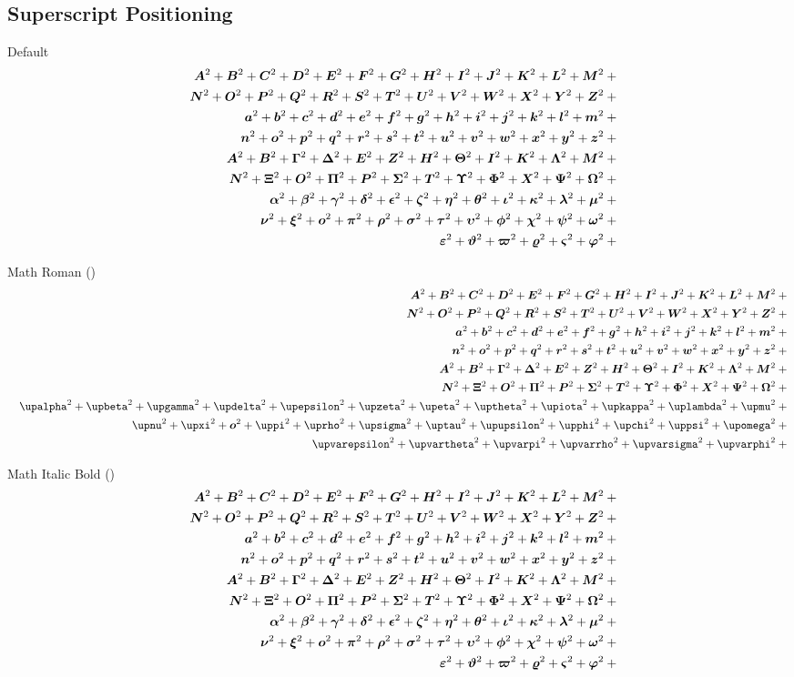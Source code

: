 \documentclass[11pt, a4paper, oneside]{article}
\theoremstyle{Plain}
\theoremstyle{Definition}
\theoremstyle{Remark}
\begin{document}
\begin{appendix}
	\subsection{Superscript Positioning \showfamily}

	Default
	\def\test#1{#1^{2}+{}}%
	\begin{eqnarray*}
	  && {\testupperi}\\
	  && {\testupperii}\\
	  && {\testloweri}\\
	  && {\testlowerii}\\
	  && {\testupgreeki}\\
	  && {\testupgreekii}\\
	  && {\testlowgreeki}\\
	  && {\testlowgreekii}\\
	  && {\testlowgreekiii}
	\end{eqnarray*}%

	Math Roman (\texttt{\string\mathrm})
	\def\test#1{\mathrm{#1}^{2}+{}}%
	\begin{eqnarray*}
	  && {\testupperi}\\
	  && {\testupperii}\\
	  && {\testloweri}\\
	  && {\testlowerii}\\
	  && {\testupgreeki}\\
	  && {\testupgreekii}\\
	  && {\testlowgreekupi}\\
	  && {\testlowgreekupii}\\
	  && {\testlowgreekupiii}
	\end{eqnarray*}%

	Math Italic Bold (\texttt{\string\bm})
	\def\test#1{\bm{#1}^{2}+{}}%
	\begin{eqnarray*}
	  && {\testupperi}\\
	  && {\testupperii}\\
	  && {\testloweri}\\
	  && {\testlowerii}\\
	  && {\testupgreeki}\\
	  && {\testupgreekii}\\
	  && {\testlowgreeki}\\
	  && {\testlowgreekii}\\
	  && {\testlowgreekiii}
	\end{eqnarray*}%


\end{appendix}
\end{document}
